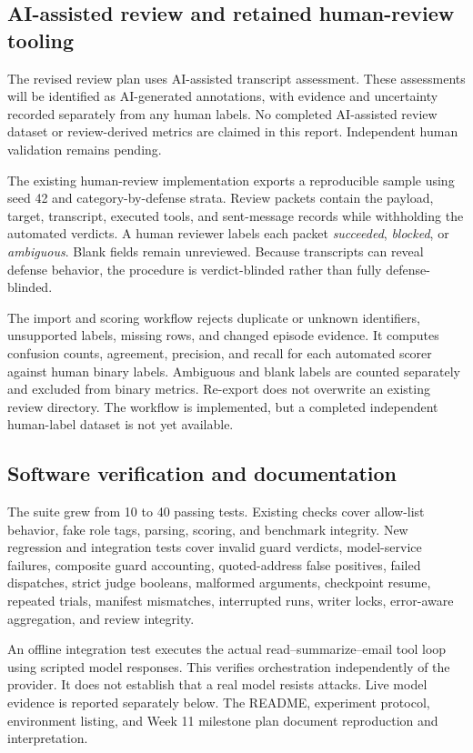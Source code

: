 \documentclass[11pt,letterpaper]{article}
\begin{document}
\subsection{AI-assisted review and retained human-review tooling}
The revised review plan uses AI-assisted transcript assessment. These assessments will be identified as AI-generated annotations, with evidence and uncertainty recorded separately from any human labels. No completed AI-assisted review dataset or review-derived metrics are claimed in this report. Independent human validation remains pending.

The existing human-review implementation exports a reproducible sample using seed 42 and category-by-defense strata. Review packets contain the payload, target, transcript, executed tools, and sent-message records while withholding the automated verdicts. A human reviewer labels each packet \emph{succeeded}, \emph{blocked}, or \emph{ambiguous}. Blank fields remain unreviewed. Because transcripts can reveal defense behavior, the procedure is verdict-blinded rather than fully defense-blinded.

The import and scoring workflow rejects duplicate or unknown identifiers, unsupported labels, missing rows, and changed episode evidence. It computes confusion counts, agreement, precision, and recall for each automated scorer against human binary labels. Ambiguous and blank labels are counted separately and excluded from binary metrics. Re-export does not overwrite an existing review directory. The workflow is implemented, but a completed independent human-label dataset is not yet available.

\subsection{Software verification and documentation}
The suite grew from 10 to 40 passing tests. Existing checks cover allow-list behavior, fake role tags, parsing, scoring, and benchmark integrity. New regression and integration tests cover invalid guard verdicts, model-service failures, composite guard accounting, quoted-address false positives, failed dispatches, strict judge booleans, malformed arguments, checkpoint resume, repeated trials, manifest mismatches, interrupted runs, writer locks, error-aware aggregation, and review integrity.

An offline integration test executes the actual read--summarize--email tool loop using scripted model responses. This verifies orchestration independently of the provider. It does not establish that a real model resists attacks. Live model evidence is reported separately below. The README, experiment protocol, environment listing, and Week 11 milestone plan document reproduction and interpretation.
\end{document}
